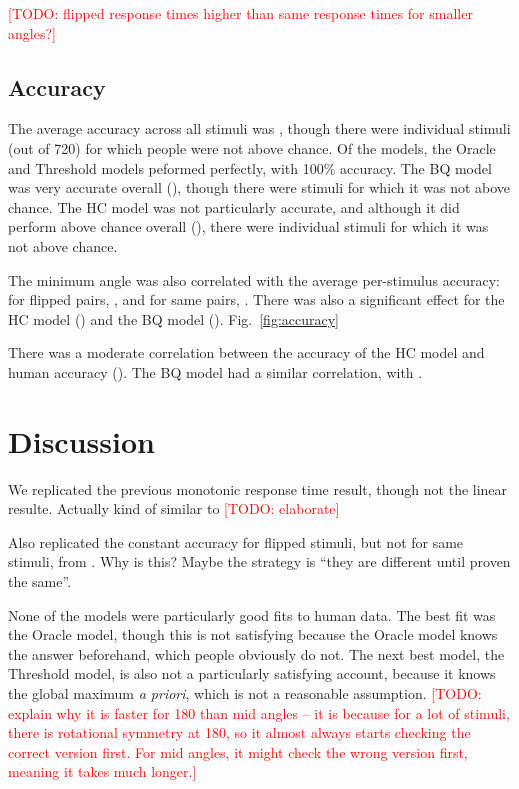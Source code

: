 \documentclass[10pt,letterpaper]{article}
\newcommand{\TODO}[1]{\textcolor{red}{[TODO: #1]}}
\newcommand{\Oc}[0]{Oracle}
\newcommand{\Th}[0]{Threshold}
\newcommand{\Hc}[0]{HC}
\newcommand{\Bq}[0]{BQ}
\begin{document}
\TODO{flipped response times higher than same response times for
  smaller angles?}

\subsection{Accuracy}

The average accuracy across all stimuli was \ExpAccuracy{}, though
there were \ExpNumChance{} individual stimuli (out of 720) for which
people were not above chance. Of the models, the \Oc{} and \Th{}
models peformed perfectly, with 100\% accuracy. The \Bq{} model was
very accurate overall (\BqAccuracy{}), though there were
\BqNumChance{} stimuli for which it was not above chance. The \Hc{}
model was not particularly accurate, and although it did perform above
chance overall (\HcAccuracy{}), there were \HcNumChance{} individual
stimuli for which it was not above chance.

The minimum angle was also correlated with the average per-stimulus
accuracy: for flipped pairs, \ExpThetaAccuracyCorrFlipped{}, and for
same pairs, \ExpThetaAccuracyCorrSame{}. There was also a significant
effect for the \Hc{} model (\HcThetaAccuracyCorr{}) and the
\Bq{} model
(\BqThetaAccuracyCorr{}). Fig.~\ref{fig:accuracy}

There was a moderate correlation between the accuracy of the \Hc{}
model and human accuracy (\ExpHcAccuracyCorr{}). The \Bq{} model had a
similar correlation, with \ExpBqAccuracyCorr{}.


\section{Discussion}

We replicated the previous monotonic response time result, though not
the linear resulte. Actually kind of similar to \cite{Gardony:2013gn}
\TODO{elaborate}

Also replicated the constant accuracy for flipped stimuli, but not for
same stimuli, from \cite{Cooper:1975wp}. Why is this? Maybe the
strategy is ``they are different until proven the same''.

None of the models were particularly good fits to human data. The best
fit was the \Oc{} model, though this is not satisfying because the
\Oc{} model knows the answer beforehand, which people obviously do
not. The next best model, the \Th{} model, is also not a
particularly satisfying account, because it knows the global maximum
\textit{a priori}, which is not a reasonable assumption. \TODO{explain
  why it is faster for 180 than mid angles -- it is because for a lot
  of stimuli, there is rotational symmetry at 180, so it almost always
  starts checking the correct version first. For mid angles, it might
  check the wrong version first, meaning it takes much longer.}
\end{document}

